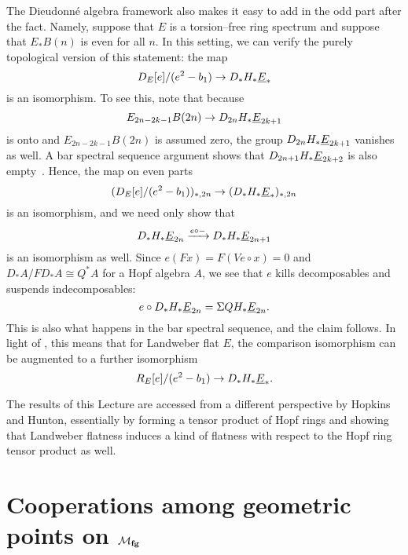\begin{remark}
The Dieudonn\'e algebra framework also makes it easy to add in the odd part after the fact.  Namely, suppose that $E$ is a torsion--free ring spectrum and suppose that $E_* B(n)$ is even for all $n$.  In this setting, we can verify the purely topological version of this statement: the map \[D_E[e] / (e^2 - b_1) \to D_* H_* \underline{\smash{E}}_{*}\] is an isomorphism.  To see this, note that because \[E_{2n-2k-1} B(2n) \to D_{2n} H_* \underline{\smash{E}}_{2k+1}\] is onto and $E_{2n-2k-1} B(2n)$ is assumed zero, the group $D_{2n} H_* \underline{\smash{E}}_{2k+1}$ vanishes as well.  A bar spectral sequence argument shows that $D_{2n+1} H_* \underline{\smash{E}}_{2k+2}$ is also empty~\cite[Lemma 11.5.1]{GoerssDieudonne}.  Hence, the map on even parts \[(D_E[e] / (e^2 - b_1))_{*, 2n} \to (D_* H_* \underline{\smash{E}}_{*})_{*, 2n}\] is an isomorphism, and we need only show that \[D_* H_* \underline{\smash{E}}_{2n} \xrightarrow{e \circ -} D_* H_* \underline{\smash{E}}_{2n+1}\] is an isomorphism as well.  Since $e(Fx) = F(Ve \circ x) = 0$ and $D_* A / FD_* A \cong Q^* A$ for a Hopf algebra $A$, we see that $e$ kills decomposables and suspends indecomposables: \[e \circ D_* H_* \underline{\smash{E}}_{2n} = \Sigma QH_* \underline{\smash{E}}_{2n}.\]  This is also what happens in the bar spectral sequence, and the claim follows.  In light of , this means that for Landweber flat $E$, the comparison isomorphism can be augmented to a further isomorphism \[R_E[e] / (e^2 - b_1) \to D_* H_* \underline{\smash{E}}_{*}.\]
\end{remark}

\begin{remark}
The results of this Lecture are accessed from a different perspective by Hopkins and Hunton, essentially by forming a tensor product of Hopf rings and showing that Landweber flatness induces a kind of flatness with respect to the Hopf ring tensor product as well.
\end{remark}










\section{Cooperations among geometric points on \texorpdfstring{$\mathcal{M}_{\mathbf{fg}}$}{Mfg}}\label{CoopnsForMoravaKandHA}

